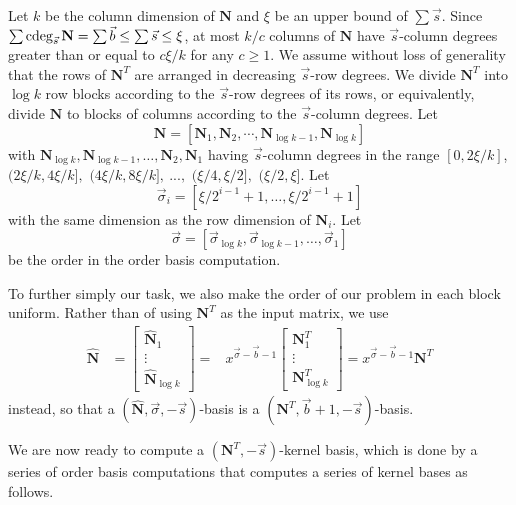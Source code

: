 

Let $k$ be the column dimension of $\mathbf{N}$ and $\xi$ be an
upper bound of $\sum\vec{s}$. Since $\sum\cdeg_{\vec{s}}\mathbf{N}=\sum\vec{b}\le\sum\vec{s}\le\xi$,
at most $k/c$ columns of $\mathbf{N}$ have $\vec{s}$-column degrees
greater than or equal to $c\xi/k$ for any $c\ge1$. We assume without
loss of generality that the rows of $\mathbf{N}^{T}$ are arranged
in decreasing $\vec{s}$-row degrees. We divide $\mathbf{N}^{T}$
into $\log k$ row blocks according to the $\vec{s}$-row degrees
of its rows, or equivalently, divide $\mathbf{N}$ to blocks of columns
according to the $\vec{s}$-column degrees. Let 
\[
\mathbf{N}=\left[\mathbf{N}_{1},\mathbf{N}_{2},\cdots,\mathbf{N}_{\log k-1},\mathbf{N}_{\log k}\right]
\]
with $\mathbf{N}_{\log k},\mathbf{N}_{\log k-1},\dots,\mathbf{N}_{2},\mathbf{N}_{1}$
having $\vec{s}$-column degrees in the range $\left[0,2\xi/k\right]$,
$(2\xi/k,4\xi/k],$ $(4\xi/k,8\xi/k],\ ...,$ $(\xi/4,\xi/2],$ $(\xi/2,\xi].$
Let 
\[
\vec{\sigma}_{i}=\left[\xi/2^{i-1}+1,\dots,\xi/2^{i-1}+1\right]
\]
 with the same dimension as the row dimension of $\mathbf{N}_{i}$.
Let 
\[
\vec{\sigma}=\left[\vec{\sigma}_{\log k},\vec{\sigma}_{\log k-1},\dots,\vec{\sigma}_{1}\right]
\]
 be the order in the order basis computation.

To further simply our task, we also make the order of our problem
in each block uniform. Rather than of using $\mathbf{N}^{T}$ as the
input matrix, we use 
\begin{eqnarray*}
\hat{\mathbf{N}} & =\begin{bmatrix}\hat{\mathbf{N}}_{1}\\
\vdots\\
\hat{\mathbf{N}}_{\log k}
\end{bmatrix}= & x^{\vec{\sigma}-\vec{b}-1}\begin{bmatrix}\mathbf{N}_{1}^{T}\\
\vdots\\
\mathbf{N}_{\log k}^{T}
\end{bmatrix}=x^{\vec{\sigma}-\vec{b}-1}\mathbf{N}^{T}
\end{eqnarray*}
 instead, so that a $\left(\hat{\mathbf{N}},\vec{\sigma},-\vec{s}\right)$-basis
is a $\left(\mathbf{N}^{T},\vec{b}+1,-\vec{s}\right)$-basis.

We are now ready to compute a $\left(\mathbf{N}^{T},-\vec{s}\right)$-kernel
basis, which is done by a series of order basis computations that
computes a series of kernel bases as follows.

